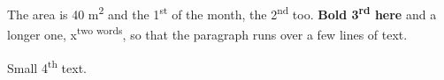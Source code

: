 \documentclass[12pt]{article}
\begin{document}
The area is 40 m\textsuperscript{2} and the 1\textsuperscript{st} of the month, the
2\textsuperscript{nd} too. \textbf{Bold 3\textsuperscript{rd} here} and a longer one,
x\textsuperscript{two words}, so that the paragraph runs over a few lines of text.

{\small Small 4\textsuperscript{th} text.\par}
\end{document}
